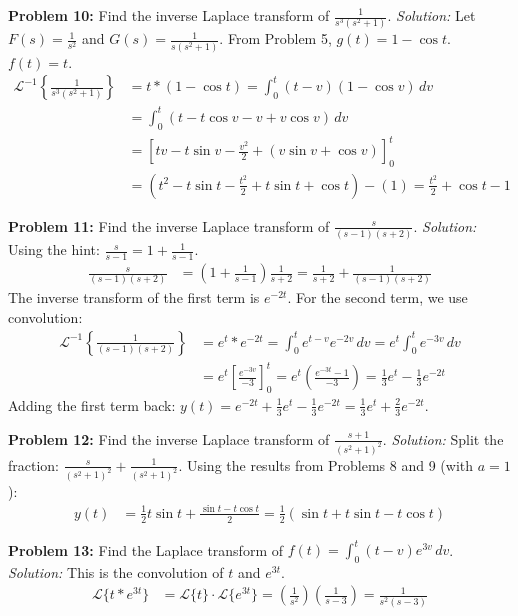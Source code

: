 \documentclass[11pt, letterpaper]{article}
\theoremstyle{definition}
\theoremstyle{remark}
\begin{document}
\textbf{Problem 10:} Find the inverse Laplace transform of $\frac{1}{s^3(s^2+1)}$.
\textit{Solution:}
Let $F(s) = \frac{1}{s^2}$ and $G(s) = \frac{1}{s(s^2+1)}$. From Problem 5, $g(t) = 1 - \cos t$. $f(t) = t$.
\begin{align*}
\mathscr{L}^{-1}\left\{\frac{1}{s^3(s^2+1)}\right\} &= t * (1 - \cos t) = \int_0^t (t-v)(1 - \cos v) \, dv \\[4pt]
&= \int_0^t (t - t\cos v - v + v\cos v) \, dv \\[4pt]
&= \left[ tv - t\sin v - \frac{v^2}{2} + (v\sin v + \cos v) \right]_0^t \\[4pt]
&= \left( t^2 - t\sin t - \frac{t^2}{2} + t\sin t + \cos t \right) - (1) = \frac{t^2}{2} + \cos t - 1
\end{align*}

\textbf{Problem 11:} Find the inverse Laplace transform of $\frac{s}{(s-1)(s+2)}$.
\textit{Solution:}
Using the hint: $\frac{s}{s-1} = 1 + \frac{1}{s-1}$.
\begin{align*}
\frac{s}{(s-1)(s+2)} &= \left(1 + \frac{1}{s-1}\right)\frac{1}{s+2} = \frac{1}{s+2} + \frac{1}{(s-1)(s+2)}
\end{align*}
The inverse transform of the first term is $e^{-2t}$. For the second term, we use convolution:
\begin{align*}
\mathscr{L}^{-1}\left\{\frac{1}{(s-1)(s+2)}\right\} &= e^t * e^{-2t} = \int_0^t e^{t-v}e^{-2v} \, dv = e^t \int_0^t e^{-3v} \, dv \\[4pt]
&= e^t \left[ \frac{e^{-3v}}{-3} \right]_0^t = e^t \left( \frac{e^{-3t} - 1}{-3} \right) = \frac{1}{3}e^t - \frac{1}{3}e^{-2t}
\end{align*}
Adding the first term back: $y(t) = e^{-2t} + \frac{1}{3}e^t - \frac{1}{3}e^{-2t} = \frac{1}{3}e^t + \frac{2}{3}e^{-2t}$.

\textbf{Problem 12:} Find the inverse Laplace transform of $\frac{s+1}{(s^2+1)^2}$.
\textit{Solution:}
Split the fraction: $\frac{s}{(s^2+1)^2} + \frac{1}{(s^2+1)^2}$.
Using the results from Problems 8 and 9 (with $a=1$):
\begin{align*}
y(t) &= \frac{1}{2}t\sin t + \frac{\sin t - t\cos t}{2} = \frac{1}{2}(\sin t + t\sin t - t\cos t)
\end{align*}

\textbf{Problem 13:} Find the Laplace transform of $f(t) = \int_0^t (t-v)e^{3v} \, dv$.
\textit{Solution:}
This is the convolution of $t$ and $e^{3t}$.
\begin{align*}
\mathscr{L}\{t * e^{3t}\} &= \mathscr{L}\{t\} \cdot \mathscr{L}\{e^{3t}\} = \left(\frac{1}{s^2}\right)\left(\frac{1}{s-3}\right) = \frac{1}{s^2(s-3)}
\end{align*}
\end{document}
